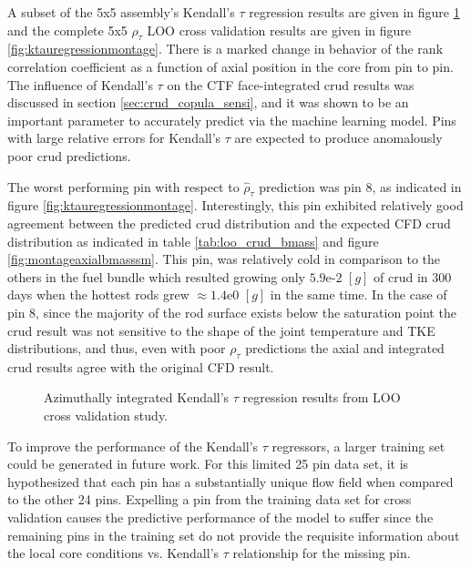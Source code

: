 A subset of the 5x5 assembly's Kendall's $\tau$ regression results are given in figure \ref{fig:ktauregression} and the complete 5x5 $\rho_\tau$ LOO cross validation results are given in figure \ref{fig:ktauregressionmontage}.  There is a marked change in behavior of the rank correlation coefficient as a function of axial position in the core from pin to pin.  The influence of Kendall's $\tau$ on the CTF face-integrated crud results was discussed in section \ref{sec:crud_copula_sensi}, and it was shown to be an important parameter to accurately predict via the machine learning model.  Pins with large relative errors for Kendall's $\tau$ are expected to produce anomalously poor crud predictions.

The worst performing pin with respect to $\hat \rho_\tau$ prediction was pin 8, as indicated in figure \ref{fig:ktauregressionmontage}.  Interestingly, this pin exhibited relatively good agreement between the predicted crud distribution and the expected CFD crud distribution as indicated in table \ref{tab:loo_crud_bmass} and figure \ref{fig:montageaxialbmasssm}.  This pin, was relatively cold in comparison to the others in the fuel bundle which resulted growing only $5.9$e-2 $[g]$ of crud in 300 days when the hottest rods grew $\approx 1.4$e0 $[g]$ in the same time.  In the case of pin 8, since the majority of the rod surface exists below the saturation point the crud result was not sensitive to the shape of the joint temperature and TKE distributions, and thus, even with poor $\rho_\tau$ predictions the axial and integrated crud results agree with the original CFD result.

\begin{figure}[H]%
    \centering
    \qquad
    \qquad
    \qquad
    \qquad
    \caption[Kendall's $\tau$ regression LOO results.]{Azimuthally integrated Kendall's $\tau$ regression results from LOO cross validation study.}%
    \label{fig:ktauregression}%
\end{figure}
To improve the performance of the Kendall's $\tau$ regressors, a larger training set could be generated in future work.  For this limited 25 pin data set, it is hypothesized that each pin has a substantially unique flow field when compared to the other 24 pins.  Expelling a pin from the training data set for cross validation causes the predictive performance of the model to suffer since the remaining pins in the training set do not provide the requisite information about the local core conditions vs. Kendall's $\tau$ relationship for the missing pin.

